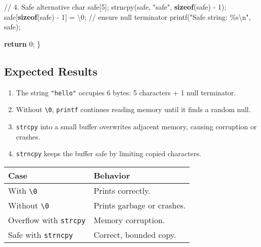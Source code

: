 \documentclass[
  letterpaper,
  DIV=11,
  numbers=noendperiod]{scrreprt}
\newenvironment{Shaded}{\begin{snugshade}}{\end{snugshade}}
\newcommand{\CharTok}[1]{\textcolor[rgb]{0.13,0.47,0.30}{#1}}
\newcommand{\CommentTok}[1]{\textcolor[rgb]{0.37,0.37,0.37}{#1}}
\newcommand{\ControlFlowTok}[1]{\textcolor[rgb]{0.00,0.23,0.31}{\textbf{#1}}}
\newcommand{\DataTypeTok}[1]{\textcolor[rgb]{0.68,0.00,0.00}{#1}}
\newcommand{\DecValTok}[1]{\textcolor[rgb]{0.68,0.00,0.00}{#1}}
\newcommand{\KeywordTok}[1]{\textcolor[rgb]{0.00,0.23,0.31}{\textbf{#1}}}
\newcommand{\NormalTok}[1]{\textcolor[rgb]{0.00,0.23,0.31}{#1}}
\newcommand{\OperatorTok}[1]{\textcolor[rgb]{0.37,0.37,0.37}{#1}}
\newcommand{\SpecialCharTok}[1]{\textcolor[rgb]{0.37,0.37,0.37}{#1}}
\newcommand{\StringTok}[1]{\textcolor[rgb]{0.13,0.47,0.30}{#1}}
\providecommand{\tightlist}{%
  \setlength{\itemsep}{0pt}\setlength{\parskip}{0pt}}
\begin{document}
\begin{Shaded}
\begin{Highlighting}[]
    \CommentTok{// 4. Safe alternative}
    \DataTypeTok{char}\NormalTok{ safe}\OperatorTok{[}\DecValTok{5}\OperatorTok{];}
\NormalTok{    strncpy}\OperatorTok{(}\NormalTok{safe}\OperatorTok{,} \StringTok{"safe"}\OperatorTok{,} \KeywordTok{sizeof}\OperatorTok{(}\NormalTok{safe}\OperatorTok{)} \OperatorTok{{-}} \DecValTok{1}\OperatorTok{);}
\NormalTok{    safe}\OperatorTok{[}\KeywordTok{sizeof}\OperatorTok{(}\NormalTok{safe}\OperatorTok{)} \OperatorTok{{-}} \DecValTok{1}\OperatorTok{]} \OperatorTok{=} \CharTok{\textquotesingle{}}\SpecialCharTok{\textbackslash{}0}\CharTok{\textquotesingle{}}\OperatorTok{;} \CommentTok{// ensure null terminator}
\NormalTok{    printf}\OperatorTok{(}\StringTok{"Safe string: }\SpecialCharTok{\%s\textbackslash{}n}\StringTok{"}\OperatorTok{,}\NormalTok{ safe}\OperatorTok{);}

    \ControlFlowTok{return} \DecValTok{0}\OperatorTok{;}
\OperatorTok{\}}
\end{Highlighting}
\end{Shaded}

\subsection{Expected Results}\label{expected-results-2}

\begin{enumerate}
\def\labelenumi{\arabic{enumi}.}
\tightlist
\item
  The string \texttt{"hello"} occupies 6 bytes: 5 characters + 1 null
  terminator.
\item
  Without
  \texttt{\textquotesingle{}\textbackslash{}0\textquotesingle{}},
  \texttt{printf} continues reading memory until it finds a random null.
\item
  \texttt{strcpy} into a small buffer overwrites adjacent memory,
  causing corruption or crashes.
\item
  \texttt{strncpy} keeps the buffer safe by limiting copied characters.
\end{enumerate}

\begin{longtable}[]{@{}ll@{}}
\toprule\noalign{}
Case & Behavior \\
\midrule\noalign{}
\endhead
\bottomrule\noalign{}
\endlastfoot
With \texttt{\textquotesingle{}\textbackslash{}0\textquotesingle{}} &
Prints correctly. \\
Without \texttt{\textquotesingle{}\textbackslash{}0\textquotesingle{}} &
Prints garbage or crashes. \\
Overflow with \texttt{strcpy} & Memory corruption. \\
Safe with \texttt{strncpy} & Correct, bounded copy. \\
\end{longtable}
\end{document}
